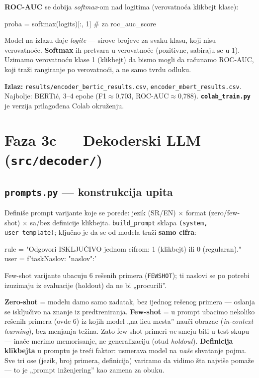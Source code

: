 \documentclass[11pt,a4paper]{article}
\newcommand{\fajl}[1]{\textbf{\texttt{#1}}}
\newcommand{\kod}[1]{\texttt{#1}}
\begin{document}
\textbf{ROC-AUC} se dobija \emph{softmax}-om nad logitima (verovatnoća klikbejt klase):
\begin{code}
proba = softmax(logits)[:, 1]   # za roc_auc_score
\end{code}
\begin{teorija}
Model na izlazu daje \emph{logite} --- sirove brojeve za svaku klasu, koji nisu
verovatnoće. \textbf{Softmax} ih pretvara u verovatnoće (pozitivne, sabiraju se u 1).
Uzimamo verovatnoću klase 1 (klikbejt) da bismo mogli da računamo ROC-AUC, koji traži
rangiranje po verovatnoći, a ne samo tvrdu odluku.
\end{teorija}

\textbf{Izlaz:} \kod{results/encoder\_bertic\_results.csv},
\kod{encoder\_mbert\_results.csv}. Najbolje: BERTić, 3--4 epohe (F1$\approx$0,703,
ROC-AUC$\approx$0,788). \fajl{colab\_train.py} je verzija prilagođena Colab okruženju.

\section{Faza 3c --- Dekoderski LLM (\texttt{src/decoder/})}

\subsection{\texttt{prompts.py} --- konstrukcija upita}
Definiše prompt varijante koje se porede: jezik (SR/EN) $\times$ format
(zero/few-shot) $\times$ sa/bez definicije klikbejta. \kod{build\_prompt} sklapa
\kod{(system, user\_template)}; ključno je da se od modela traži \textbf{samo cifra}:
\begin{code}
rule = "Odgovori ISKLJUČIVO jednom cifrom: 1 (klikbejt) ili 0 (regularan)."
user = f'{task}\n{}Naslov: "{{naslov}}"\nOdgovor:'
\end{code}
Few-shot varijante ubacuju 6 rešenih primera (\kod{FEWSHOT}); ti naslovi se po potrebi
izuzimaju iz evaluacije (holdout) da ne bi „procurili''.

\begin{teorija}
\textbf{Zero-shot} = modelu damo samo zadatak, bez ijednog rešenog primera --- oslanja
se isključivo na znanje iz predtreniranja. \textbf{Few-shot} = u prompt ubacimo
nekoliko rešenih primera (ovde 6) iz kojih model „na licu mesta'' nauči obrazac
(\emph{in-context learning}), bez menjanja težina. Zato few-shot primeri \emph{ne} smeju
biti u test skupu --- inače merimo memorisanje, ne generalizaciju (otud \emph{holdout}).
\textbf{Definicija klikbejta} u promptu je treći faktor: usmerava model na \emph{naše}
shvatanje pojma. Sve tri ose (jezik, broj primera, definicija) variramo da vidimo šta
najviše pomaže --- to je „prompt inženjering'' kao zamena za obuku.
\end{teorija}
\end{document}
